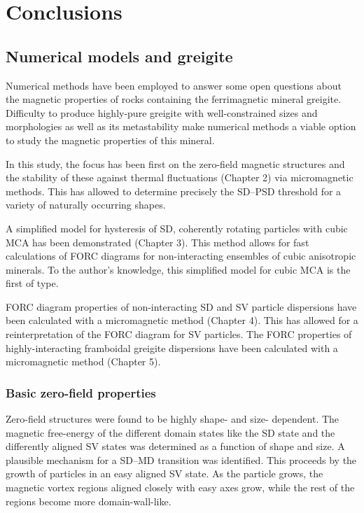 \chapter{Conclusions}

\section{Numerical models and greigite}
Numerical methods have been employed to answer some open questions about the magnetic properties of rocks containing the ferrimagnetic mineral greigite. Difficulty to produce highly-pure greigite with well-constrained sizes and morphologies as well as its metastability make numerical methods a viable option to study the magnetic properties of this mineral.\par

In this study, the focus has been first on the zero-field magnetic structures and the stability of these against thermal fluctuations (Chapter 2) via micromagnetic methods. This has allowed to determine precisely the SD--PSD threshold for a variety of naturally occurring shapes.\par

A simplified model for hysteresis of SD, coherently rotating particles with cubic MCA has been demonstrated (Chapter 3). This method allows for fast calculations of FORC diagrams for non-interacting ensembles of cubic anisotropic minerals. To the author's knowledge, this simplified model for cubic MCA is the first of type.\par

FORC diagram properties of non-interacting SD and SV particle dispersions have been calculated with a micromagnetic method (Chapter 4). This has allowed for a reinterpretation of the FORC diagram for SV particles. The FORC properties of highly-interacting framboidal greigite dispersions have been calculated with a micromagnetic method (Chapter 5).\par

\subsection{Basic zero-field properties}
Zero-field structures were found to be highly shape- and size- dependent. The magnetic free-energy of the different domain states like the SD state and the differently aligned SV states was determined as a function of shape and size. A plausible mechanism for a SD--MD transition was identified. This proceeds by the growth of particles in an easy aligned SV state. As the particle grows, the magnetic vortex regions aligned closely with easy axes grow, while the rest of the regions become more domain-wall-like.\par

